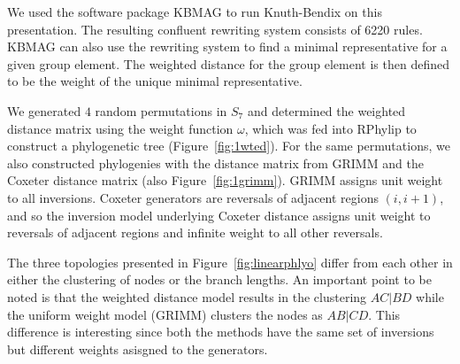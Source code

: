 \documentclass[utf8]{Frontiers_LaTex_Templates/frontiersFPHY} %
\numberwithin{equation}{section}
\begin{document}
We used the software package KBMAG \citep{holtkbmag} to run Knuth-Bendix on this presentation. The resulting confluent rewriting system consists of 6220 rules. KBMAG can also use the rewriting system to find a minimal representative for a given group element.  The weighted distance for the group element is then defined to be the weight of the unique minimal representative.

We generated $4$ random permutations in $S_7$ and determined the weighted distance matrix using the weight function $\omega$, which was fed into RPhylip \citep{revell2014rphylip,felsenstein1993phylip} to construct a phylogenetic tree (Figure~\ref{fig:1wted}). For the same permutations, we also constructed phylogenies with the distance matrix from GRIMM \citep{tesler2002grimm} and the Coxeter distance matrix (also Figure~\ref{fig:1grimm}). GRIMM assigns unit weight to all inversions. Coxeter generators are reversals of adjacent regions $(i, i+1)$, and so the inversion model underlying Coxeter distance assigns unit weight to reversals of adjacent regions and infinite weight to all other reversals.

The three topologies presented in Figure~\ref{fig:linearphlyo} differ from each other in either the clustering of nodes or the branch lengths. An important point to be noted is that the weighted distance model results in the clustering $AC|BD$ while the uniform weight model (GRIMM) clusters the nodes as $AB|CD$. This difference is interesting since both the methods have the same set of inversions but different weights asisgned to the generators.
\end{document}
